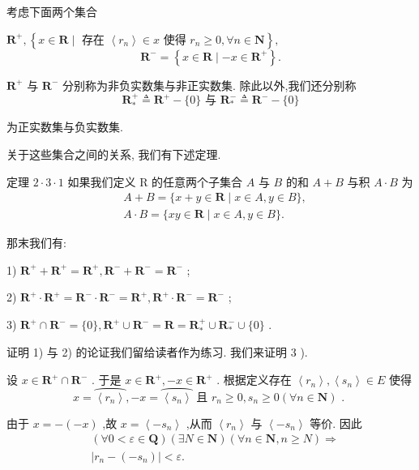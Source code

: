 考虑下面两个集合

${\mathbf{R}}^{ + },\left\{  {x \in  \mathbf{R} \mid  \text{ 存在 }\left\langle  {r}_{n}\right\rangle   \in  x\text{ 使得 }{r}_{n} \geq  0,\forall n \in  \mathbf{N}}\right\}  ,$
$${\mathbf{R}}^{ - } = \left\{  {x \in  \mathbf{R} \mid   - x \in  {\mathbf{R}}^{ + }}\right\}  .$$

${\mathbf{R}}^{ + }$ 与 ${\mathbf{R}}^{ - }$ 分别称为非负实数集与非正实数集. 除此以外,我们还分别称
$${\mathbf{R}}_{ * }^{ + } \triangleq  {\mathbf{R}}^{ + } - \{ 0\} \text{ 与 }{\mathbf{R}}_{ * }^{ - } \triangleq  {\mathbf{R}}^{ - } - \{ 0\}$$

为正实数集与负实数集.

关于这些集合之间的关系, 我们有下述定理.

定理 $2 \cdot  3 \cdot  1$ 如果我们定义 $\mathrm{R}$ 的任意两个子集合 $A$ 与 $B$ 的和 $A + B$ 与积 $A \cdot  B$ 为
\begin{align*}
	&A + B = \{ x + y \in  \mathbf{R} \mid  x \in  A,y \in  B\} ,\\
	&A \cdot  B = \{ {xy} \in  \mathbf{R} \mid  x \in  A,y \in  B\} .
\end{align*}

那末我们有:

1) ${\mathbf{R}}^{ + } + {\mathbf{R}}^{ + } = {\mathbf{R}}^{ + },{\mathbf{R}}^{ - } + {\mathbf{R}}^{ - } = {\mathbf{R}}^{ - }$ ;

2) ${\mathbf{R}}^{ + } \cdot  {\mathbf{R}}^{ + } = {\mathbf{R}}^{ - } \cdot  {\mathbf{R}}^{ - } = {\mathbf{R}}^{ + },{\mathbf{R}}^{ + } \cdot  {\mathbf{R}}^{ - } = {\mathbf{R}}^{ - }$ ;

3) ${\mathbf{R}}^{ + } \cap  {\mathbf{R}}^{ - } = \{ 0\} ,{\mathbf{R}}^{ + } \cup  {\mathbf{R}}^{ - } = \mathbf{R} = {\mathbf{R}}_{ * }^{ + } \cup  {\mathbf{R}}_{ * }^{ - } \cup  \{ 0\}$ .

证明 1) 与 2) 的论证我们留给读者作为练习. 我们来证明 3 ).

设 $x \in  {\mathbf{R}}^{ + } \cap  {\mathbf{R}}^{ - }$ . 于是 $x \in  {\mathbf{R}}^{ + }, - x \in  {\mathbf{R}}^{ + }$ . 根据定义存在 $\left\langle  {r}_{n}\right\rangle  ,\left\langle  {s}_{n}\right\rangle   \in  E$ 使得
$$x = \overset{⏜}{\left\langle  {r}_{n}\right\rangle  }, - x = \overset{⏜}{\left\langle  {s}_{n}\right\rangle  }\text{ 且 }{r}_{n} \geq  0,{s}_{n} \geq  0\left( {\forall n \in  \mathbf{N}}\right) \text{ . }$$

由于 $x =  - \left( {-x}\right)$ ,故 $x = \left\langle  {-{s}_{n}}\right\rangle$ ,从而 $\left\langle  {r}_{n}\right\rangle$ 与 $\left\langle  {-{s}_{n}}\right\rangle$ 等价. 因此
\begin{align*}
	&\left( {\forall 0 < \varepsilon  \in  \mathbf{Q}}\right) \left( {\exists N \in  \mathbf{N}}\right) \left( {\forall n \in  \mathbf{N},n \geq  N}\right)  \Rightarrow\\
	&\left| {{r}_{n} - \left( {-{s}_{n}}\right) }\right|  < \varepsilon .
\end{align*}

